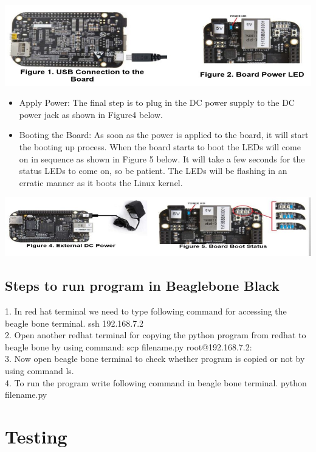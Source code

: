 \documentclass[a4paper,12pt]{article}
\begin{document}
		\includegraphics[width=\textwidth]{bbb_01}
	
	\begin{itemize}
		\item Apply Power: 
		The final step is to plug in the DC power supply to the DC power jack as shown in Figure4 below. 
		
		\item Booting the Board: 
		As soon as the power is applied to the board, it will start the booting up process. When the board starts to boot the LEDs will come on in sequence as shown in Figure 5 below. It will take a few seconds for the status LEDs to come on, so be patient. The LEDs will be flashing in an erratic manner as it boots the Linux kernel. 
	\end{itemize}
	
	\includegraphics[width=\textwidth]{bbb_02}
	
\subsection{Steps to run program in Beaglebone Black}
	1.	In red hat terminal we need to type following command for accessing the beagle bone terminal. 
	ssh 192.168.7.2 \\
	2.	Open another redhat terminal for copying the python program from redhat to beagle bone by using command: 
	scp filename.py root@192.168.7.2: \\
	3.	Now open beagle bone terminal to check whether program is copied or not by using command ls. \\
	4.	To run the program write following command in beagle bone terminal. 
	python filename.py \\
	
	 
			
		
\section{Testing}
\end{document}
